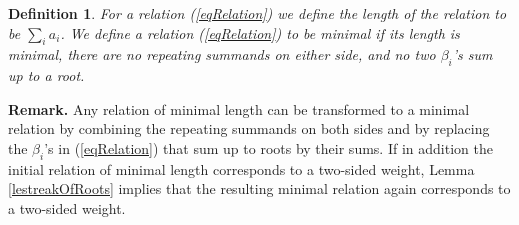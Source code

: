 \documentclass[12pt]{report}
\newtheorem{lemma}[theo]{Lemma}
\newenvironment{proof}[1][]{ \textbf{Proof#1. }}{$\Box$\medskip}
\newtheorem{defi}[theo]{Definition}
\newcommand{\kk}{\mathfrak{k}}
\newcommand{\gG}{\mathfrak{g}}
\newcommand{\refeq}[1]{(\ref{#1})}
\newcommand{\linspan}{\mathrm{span}}
\begin{document}



\begin{defi}\label{defMinRelation}
For a relation \refeq{eqRelation} we define \emph{the length of the relation} to be $\sum_i a_i$. We define a relation \refeq{eqRelation} to be \emph{minimal} if its length is minimal, there are no repeating summands on either side, and no two $\beta_i$'s sum up to a root. 
\end{defi}

\textbf{Remark.} Any relation of minimal length can be transformed to a minimal relation by combining the repeating summands on both sides and by replacing the $\beta_i$'s in \refeq{eqRelation} that sum up to roots by their sums. If in addition the initial relation of minimal length corresponds to a two-sided weight, Lemma \ref{lestreakOfRoots} implies that the resulting minimal relation again corresponds to a two-sided weight.
\end{document}
